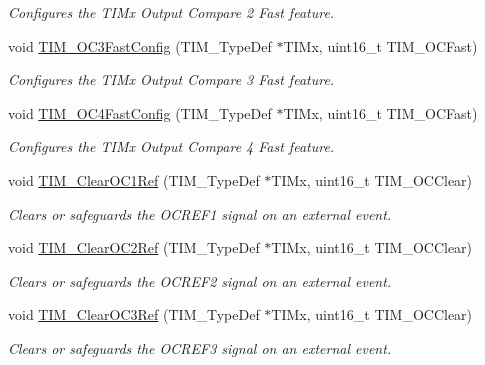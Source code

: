 \begin{DoxyCompactItemize}
\begin{DoxyCompactList}\small\item\em Configures the T\-I\-Mx Output Compare 2 Fast feature. \end{DoxyCompactList}\item 
void \hyperlink{group___t_i_m___group2_gab2f3698e6e56bd9b0a4be7056ba789e1}{T\-I\-M\-\_\-\-O\-C3\-Fast\-Config} (T\-I\-M\-\_\-\-Type\-Def $\ast$T\-I\-Mx, uint16\-\_\-t T\-I\-M\-\_\-\-O\-C\-Fast)
\begin{DoxyCompactList}\small\item\em Configures the T\-I\-Mx Output Compare 3 Fast feature. \end{DoxyCompactList}\item 
void \hyperlink{group___t_i_m___group2_ga58279a04e8ea5333f1079d3cce8dde12}{T\-I\-M\-\_\-\-O\-C4\-Fast\-Config} (T\-I\-M\-\_\-\-Type\-Def $\ast$T\-I\-Mx, uint16\-\_\-t T\-I\-M\-\_\-\-O\-C\-Fast)
\begin{DoxyCompactList}\small\item\em Configures the T\-I\-Mx Output Compare 4 Fast feature. \end{DoxyCompactList}\item 
void \hyperlink{group___t_i_m___group2_ga34e926cd8a99cfcc7480b2d6de5118b6}{T\-I\-M\-\_\-\-Clear\-O\-C1\-Ref} (T\-I\-M\-\_\-\-Type\-Def $\ast$T\-I\-Mx, uint16\-\_\-t T\-I\-M\-\_\-\-O\-C\-Clear)
\begin{DoxyCompactList}\small\item\em Clears or safeguards the O\-C\-R\-E\-F1 signal on an external event. \end{DoxyCompactList}\item 
void \hyperlink{group___t_i_m___group2_gac474ebc815d24c8a589969e0c68b27b0}{T\-I\-M\-\_\-\-Clear\-O\-C2\-Ref} (T\-I\-M\-\_\-\-Type\-Def $\ast$T\-I\-Mx, uint16\-\_\-t T\-I\-M\-\_\-\-O\-C\-Clear)
\begin{DoxyCompactList}\small\item\em Clears or safeguards the O\-C\-R\-E\-F2 signal on an external event. \end{DoxyCompactList}\item 
void \hyperlink{group___t_i_m___group2_ga0bd9476a14bd346c319945ec4fa2bc67}{T\-I\-M\-\_\-\-Clear\-O\-C3\-Ref} (T\-I\-M\-\_\-\-Type\-Def $\ast$T\-I\-Mx, uint16\-\_\-t T\-I\-M\-\_\-\-O\-C\-Clear)
\begin{DoxyCompactList}\small\item\em Clears or safeguards the O\-C\-R\-E\-F3 signal on an external event. \end{DoxyCompactList}\item 

\end{DoxyCompactItemize}
